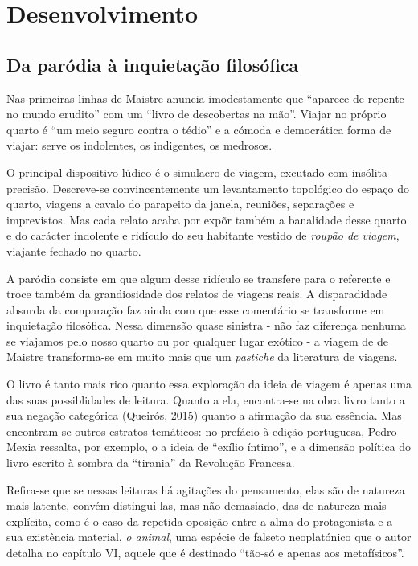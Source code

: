 \documentclass[12pt]{article}
\begin{document}
\section{Desenvolvimento}

\subsection{Da paródia à inquietação filosófica}

Nas primeiras linhas de Maistre anuncia imodestamente que ``aparece de
repente no mundo erudito'' com um ``livro de descobertas na
mão''. Viajar no próprio quarto é ``um meio seguro contra o tédio'' e
a cómoda e democrática forma de viajar: serve os indolentes, os
indigentes, os medrosos.

O principal dispositivo lúdico é o simulacro de viagem, excutado com
insólita precisão. Descreve-se convincentemente um levantamento
topológico do espaço do quarto, viagens a cavalo do parapeito da
janela, reuniões, separações e imprevistos. Mas cada relato acaba por
expõr também a banalidade desse quarto e do carácter indolente e
ridículo do seu habitante vestido de \emph{roupão de viagem}, viajante
fechado no quarto.

A paródia consiste em que algum desse ridículo se transfere para o
referente e troce também da grandiosidade dos relatos de viagens
reais. A disparadidade absurda da comparação faz ainda com que esse
comentário se transforme em inquietação filosófica. Nessa dimensão
quase sinistra - não faz diferença nenhuma se viajamos pelo nosso
quarto ou por qualquer lugar exótico - a viagem de de Maistre
transforma-se em muito mais que um \emph{pastiche} da literatura de
viagens.

O livro é tanto mais rico quanto essa exploração da ideia de viagem é
apenas uma das suas possiblidades de leitura. Quanto a ela,
encontra-se na obra livro tanto a sua negação categórica (Queirós,
2015) quanto a afirmação da sua essência. Mas encontram-se outros
estratos temáticos: no prefácio à edição portuguesa, Pedro Mexia
ressalta, por exemplo, o a ideia de ``exílio íntimo'', e a dimensão
política do livro escrito à sombra da ``tirania'' da Revolução
Francesa.

Refira-se que se nessas leituras há agitações do pensamento, elas são
de natureza mais latente, convém distingui-las, mas não demasiado, das
de natureza mais explícita, como é o caso da repetida oposição entre a
alma do protagonista e a sua existência material, \emph{o animal}, uma
espécie de falseto neoplatónico que o autor detalha no capítulo VI,
aquele que é destinado ``tão-só e apenas aos metafísicos''.
\end{document}
